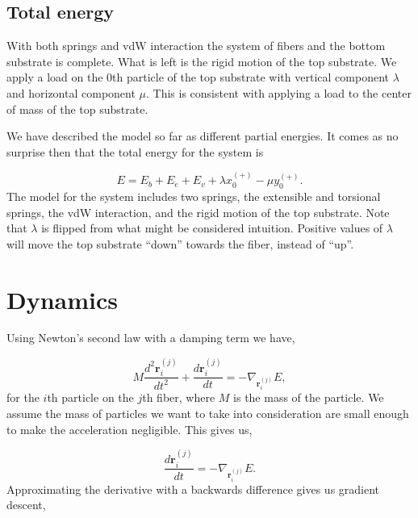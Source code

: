 
\subsection{Total energy}

With both springs and vdW interaction the system of fibers and the bottom substrate is complete. What is left is the rigid motion of the top substrate. We apply a load on the $0$th particle of the top substrate with vertical component $\lambda$ and horizontal component $\mu$. This is consistent with applying a load to the center of mass of the top substrate.

We have described the model so far as different partial energies. It comes as no surprise then that the total energy for the system is

\begin{equation}
	E = E_b + E_e + E_v + \lambda x_0^{(+)} - \mu y_0^{(+)}.
\end{equation}
The model for the system includes two springs, the extensible and torsional springs, the vdW interaction, and the rigid motion of the top substrate. Note that $\lambda$ is flipped from what might be considered intuition. Positive values of $\lambda$ will move the top substrate ``down'' towards the fiber, instead of ``up''.

\section{Dynamics}

Using Newton's second law with a damping term we have,

\begin{equation}
	M\frac{d^2\textbf{r}_i^{(j)}}{dt^2} + \frac{d\textbf{r}_i^{(j)}}{dt} = -\nabla_{\textbf{r}_i^{(j)}}E,
\end{equation}
for the $i$th particle on the $j$th fiber, where $M$ is the mass of the particle. We assume the mass of particles we want to take into consideration are small enough to make the acceleration negligible. This gives us,

\begin{equation}
	 \frac{d\textbf{r}_i^{(j)}}{dt} = -\nabla_{\textbf{r}_i^{(j)}}E.
\end{equation}
Approximating the derivative with a backwards difference gives us gradient descent,

